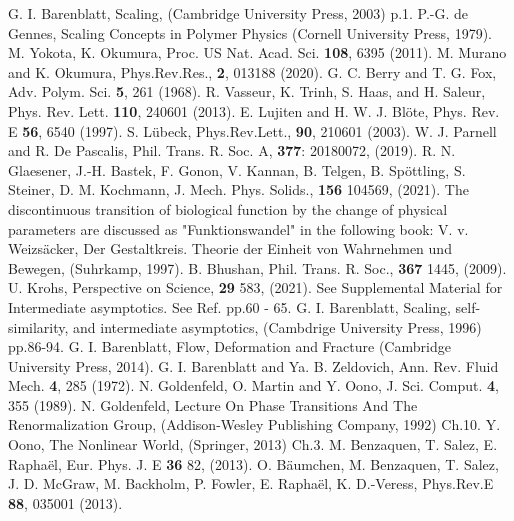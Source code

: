\documentclass[default,iicol,10pt]{sn-jnl}%
\theoremstyle{thmstyleone}%
\theoremstyle{thmstyletwo}%
\theoremstyle{thmstylethree}%
\begin{document}
\begin{thebibliography}{99}

G. I. Barenblatt, Scaling, (Cambridge University Press, 2003) p.1.
P.-G. de Gennes, Scaling Concepts in Polymer Physics (Cornell University Press, 1979).
M. Yokota, K. Okumura, Proc. US Nat. Acad. Sci. {\bf 108}, 6395 (2011). 
M. Murano and K. Okumura, Phys.Rev.Res., {\bf 2}, 013188 (2020).
G. C. Berry and T. G. Fox, Adv. Polym. Sci. {\bf 5}, 261 (1968).
R. Vasseur, K. Trinh, S. Haas, and H. Saleur, Phys. Rev. Lett. {\bf 110}, 240601 (2013).
E. Lujiten and H. W. J. Bl{\"{o}}te, Phys. Rev. E {\bf 56}, 6540 (1997).
S. L{\"{u}}beck, Phys.Rev.Lett., {\bf 90}, 210601 (2003).
W. J. Parnell and R. De Pascalis, Phil. Trans. R. Soc. A, {\bf 377}: 20180072, (2019).
R. N. Glaesener, J.-H. Bastek, F. Gonon, V. Kannan, B. Telgen, B. Sp{\"{o}}ttling, S. Steiner, D. M. Kochmann, J. Mech. Phys. Solids., {\bf 156} 104569, (2021).
The discontinuous transition of biological function by the change of physical parameters are discussed as "Funktionswandel" in the following book: V. v. Weizs{\"{a}}cker, Der Gestaltkreis. Theorie der Einheit von Wahrnehmen und Bewegen, (Suhrkamp, 1997).
B. Bhushan, Phil. Trans. R. Soc., {\bf 367} 1445, (2009).
U. Krohs, Perspective on Science, {\bf 29} 583, (2021).
See Supplemental Material for Intermediate asymptotics.
See Ref. \cite{Barenblatt2003} pp.60 - 65.
G. I. Barenblatt, Scaling, self-similarity, and intermediate asymptotics, (Cambdrige University Press, 1996) pp.86-94.
G. I. Barenblatt, Flow, Deformation and Fracture (Cambridge University Press, 2014).
G. I. Barenblatt and Ya. B. Zeldovich, Ann. Rev. Fluid Mech. {\bf 4}, 285 (1972).
N. Goldenfeld, O. Martin and Y. Oono, J. Sci. Comput. {\bf 4}, 355 (1989).
N. Goldenfeld, Lecture On Phase Transitions And The Renormalization Group, (Addison-Wesley Publishing Company, 1992) Ch.10.
Y. Oono, The Nonlinear World, (Springer, 2013) Ch.3.
M. Benzaquen, T. Salez, E. Rapha{{\"e}}l, Eur. Phys. J. E {\bf 36} 82, (2013).
O. B{\"{a}}umchen, M. Benzaquen, T. Salez, J. D. McGraw, M. Backholm, P. Fowler, E. Rapha{{\"e}}l, K. D.-Veress, Phys.Rev.E {\bf 88}, 035001 (2013).

\end{thebibliography}
\end{document}
